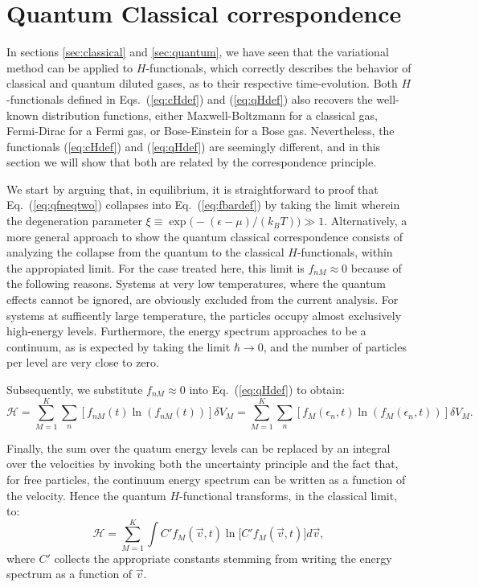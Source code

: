 

\section{Quantum Classical correspondence}\label{sec:qccorrespondence}

In sections \ref{sec:classical} and \ref{sec:quantum}, we have seen that the variational
method can be applied to $H$-functionals, which correctly describes the behavior of
classical and quantum diluted gases, as to their respective time-evolution.
Both $H$-functionals defined in Eqs.~(\ref{eq:cHdef}) and
(\ref{eq:qHdef}) also recovers the well-known distribution functions, either Maxwell-Boltzmann
for a classical gas, Fermi-Dirac for a Fermi gas, or Bose-Einstein for a Bose gas. Nevertheless,
the functionals (\ref{eq:cHdef}) and
(\ref{eq:qHdef}) are seemingly different, and in this section we will show that both are
related by the correspondence principle.

We start by arguing that, in equilibrium, it is straightforward to proof that
Eq.~(\ref{eq:qfneqtwo}) collapses
into Eq.~(\ref{eq:fbardef}) by taking the limit wherein the 
degeneration parameter $\xi\equiv\exp\big(-(\epsilon-\mu)/(k_BT)\big) \gg 1$.
Alternatively, a more general approach to show the quantum classical correspondence
consists of analyzing the collapse from the quantum to the classical $H$-functionals,
within the appropiated limit.
For the case treated here, this limit is $f_{nM} \approx 0$ because of the following reasons.
Systems at very low temperatures, where the quantum effects cannot be ignored, are obviously excluded
from the current analysis. For systems at sufficently large temperature, the particles
occupy almost exclusively high-energy levels. 
Furthermore, the energy spectrum approaches to be a continuum, as is expected by taking the limit
$\hbar\to0$, and the number of particles per level are very close to zero.

Subsequently, we substitute $f_{nM}\approx0$ into Eq.~(\ref{eq:qHdef}) to obtain:
%
\begin{equation}\label{h-quantic2}
    \mathcal{H}= \sum_{M=1}^{K} \sum_n
    \left[ f_{nM}(t)\ln \left(f_{nM}(t)\right)\right] \delta V_M
    =\sum_{M=1}^{K} \sum_n
    \left[ f_{M}(\epsilon_n,t) \ln \left( f_{M}(\epsilon_n,t)\right)\right] \delta V_M.
\end{equation}
%

Finally, the sum over the quatum energy levels can be replaced by an integral over the velocities
by invoking both the uncertainty principle and the fact that, for free particles, the continuum
energy spectrum
can be written as a function of the velocity. Hence the quantum $H$-functional
transforms, in the classical limit, to:
%
\begin{equation}\label{eq:qHclassLim}
    \mathcal{H}= \sum_{M=1}^{K}\int C'f_M(\vec v,t)\ln\big[C' f_M(\vec v,t)\big] d\vec v,
\end{equation}
%
where $C'$ collects the appropriate constants stemming from writing the energy spectrum as
a function of $\vec v$.






